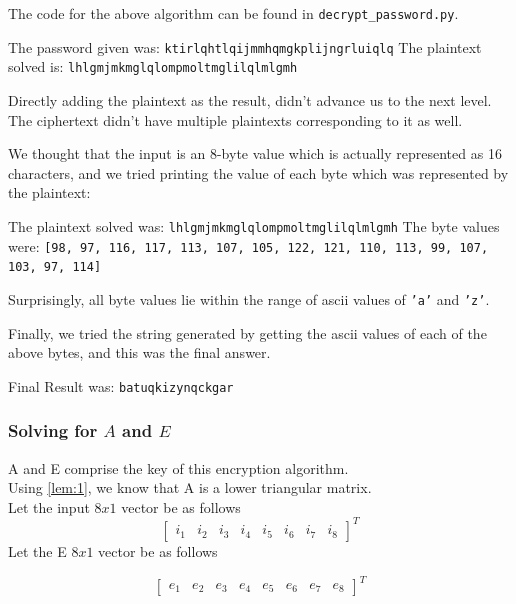 \documentclass[10pt,twoside]{article}
\begin{document}
The code for the above algorithm can be found in \texttt{decrypt\_password.py}. \newline

The password given was: \texttt{ktirlqhtlqijmmhqmgkplijngrluiqlq} \newline
The plaintext solved is: \texttt{lhlgmjmkmglqlompmoltmglilqlmlgmh} \newline

Directly adding the plaintext as the result, didn't advance us to the next level. \newline
The ciphertext didn't have multiple plaintexts corresponding to it as well. \newline

We thought that the input is an 8-byte value which is actually represented as 16 characters, and we tried printing the value of each byte which was represented by the plaintext: \newline

The plaintext solved was: \texttt{lhlgmjmkmglqlompmoltmglilqlmlgmh} \newline
The byte values were: \newline
\texttt{[98, 97, 116, 117, 113, 107, 105, 122, 121, 110, 113, 99, 107, 103, 97, 114]} \newline

Surprisingly, all byte values lie within the range of ascii values of \texttt{'a'} and \texttt{'z'}. \newline

Finally, we tried the string generated by getting the ascii values of each of the above bytes, and this was the final answer. \newline

Final Result was: \texttt{batuqkizynqckgar}

\subsubsection{Solving for $A$ and $E$}
A and E comprise the key of this encryption algorithm.\\
Using \cref{lem:1}, we know that A is a lower triangular matrix.\\
Let the input $8x1$ vector be as follows
  $$\begin{bmatrix}
    i_1 & i_2 & i_3 & i_4 & i_5 & i_6 & i_7 & i_8
  \end{bmatrix}^T$$
Let the E $8x1$ vector be as follows

  $$\begin{bmatrix}
    e_1 & e_2 & e_3 & e_4 & e_5 & e_6 & e_7 & e_8
  \end{bmatrix}^T$$
\end{document}
